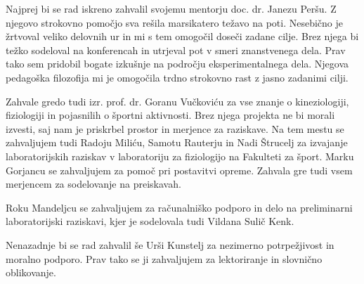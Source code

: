 \zahvala 
Najprej bi se rad iskreno zahvalil svojemu mentorju doc. dr. Janezu Peršu. Z njegovo strokovno pomočjo sva rešila marsikatero težavo na poti. Nesebično je žrtvoval veliko delovnih ur in mi s tem omogočil doseči zadane cilje. Brez njega bi težko sodeloval na konferencah in utrjeval pot v smeri znanstvenega dela. Prav tako sem pridobil bogate izkušnje na področju eksperimentalnega dela. Njegova pedagoška filozofija mi je omogočila trdno strokovno rast z jasno zadanimi cilji.

Zahvale gredo tudi izr. prof. dr. Goranu Vučkoviću za vse znanje o kineziologiji, fiziologiji in pojasnilih o športni aktivnosti. Brez njega projekta ne bi morali izvesti, saj nam je priskrbel prostor in merjence za raziskave. Na tem mestu se zahvaljujem tudi Radoju Miliću, Samotu Rauterju in Nadi Štrucelj za izvajanje laboratorijskih raziskav v laboratoriju za fiziologijo na Fakulteti za šport. Marku Gorjancu se zahvaljujem za pomoč pri postavitvi opreme. Zahvala gre tudi vsem merjencem za sodelovanje na preiskavah. 

Roku Mandeljcu se zahvaljujem za računalniško podporo in delo na preliminarni laboratorijski raziskavi, kjer je sodelovala tudi Vildana Sulič Kenk.

Nenazadnje bi se rad zahvalil še Urši Kunstelj za nezimerno potrpežjivost in moralno podporo. Prav tako se ji zahvaljujem za lektoriranje in slovnično oblikovanje.